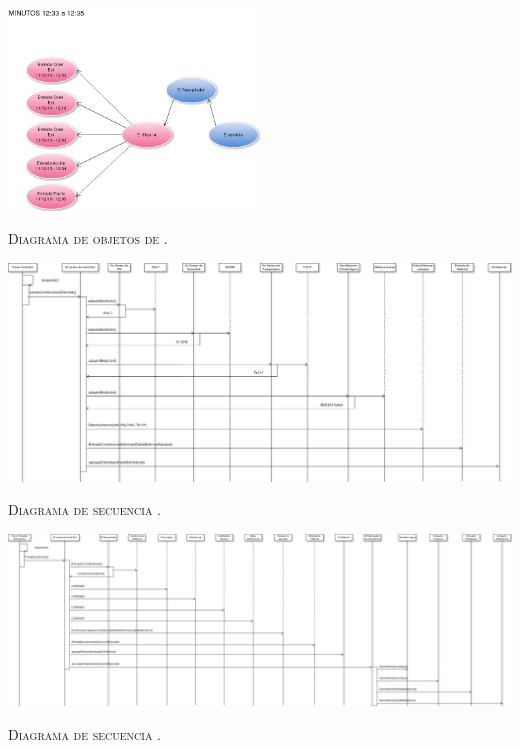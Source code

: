 \begin{landscape}
    \includegraphics[width=0.5\textwidth]{img/objetosHistorial.png}
    \centerline{ \small \scshape Diagrama de objetos de \historial{}.}

    \hfill

    \includegraphics[width=1.2\textwidth]{img/condicionesExternas.png}
    \centerline{ \small \scshape Diagrama de secuencia \condiciones{}.}

    \hfill

    \includegraphics[width=1.3\textwidth]{img/decisiones.png}
    \centerline{ \small \scshape Diagrama de secuencia \decisiones{}.}


\end{landscape}
